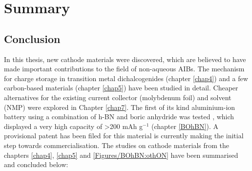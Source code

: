 \chapter{Summary} 
\label{chap9} 
\section{Conclusion}

In this thesis, new cathode materials were discovered, which are believed to have made important contributions to the field of non-aqueous AIBs. The mechanism for charge storage in transition metal dichalcogenides (chapter \ref{chap4}) and a few carbon-based materials (chapter \ref{chap5}) have been studied in detail. Cheaper alternatives for the existing current collector (molybdenum foil) and solvent (NMP) were explored in Chapter \ref{chap7}. The first of its kind aluminium-ion battery using a combination of h-BN and boric anhydride was tested , which displayed a very high capacity  of >200 mAh g$^{-1}$ (chapter \ref{BOhBN}). A provisional patent has been filed for this material is currently making the initial step towards commercialisation. The studies on cathode materials from the chapters \ref{chap4}, \ref{chap5} and \ref{Figures/BOhBN:othON} have been summarised and concluded below:\\
